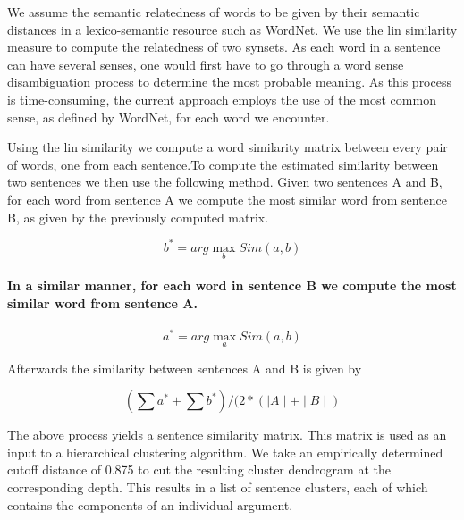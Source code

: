 \par
We assume the semantic relatedness of words to be given by their semantic distances in a lexico-semantic resource such as WordNet. We use the lin similarity measure to compute the relatedness of two synsets. As each word in a sentence can have several senses, one would first have to go through a word sense disambiguation process to determine the most probable meaning. As this process is time-consuming, the current approach employs the use of the most common sense, as defined by WordNet, for each word we encounter.
\par
Using the lin similarity we compute a word similarity matrix between every pair of words, one from each sentence.To compute the estimated similarity between two sentences we then use the following method. Given two sentences A and B, for each word from sentence A we compute the most similar word from sentence B, as given by the previously computed matrix.

\[ b^* = arg \max_b Sim(a,b) \]

\paragraph*{In a similar manner, for each word in sentence B we compute the most similar word from sentence A.}

\[ a^* = arg \max_a Sim(a,b) \]

\par
Afterwards the similarity between sentences A and B is given by

\[ ( \sum{a^*} + \sum{b^*}) / (2 * (\mid A\mid + \mid B \mid ) \]

\par
The above process yields a sentence similarity matrix. This matrix is used as an input to a hierarchical clustering algorithm. We take an empirically determined cutoff distance of 0.875 to cut the resulting cluster dendrogram at the corresponding depth. This results in a list of sentence clusters, each of which contains the components of an individual argument.


